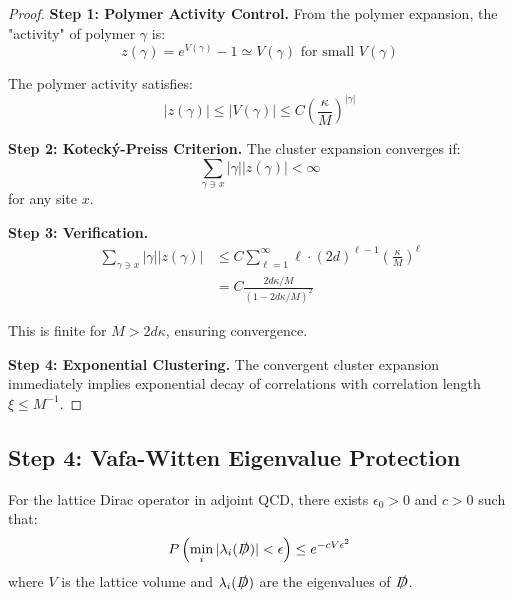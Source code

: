 \begin{proof}
\textbf{Step 1: Polymer Activity Control.}
From the polymer expansion, the "activity" of polymer $\gamma$ is:
\begin{equation}
z(\gamma) = e^{V(\gamma)} - 1 \simeq V(\gamma) \text{ for small } V(\gamma)
\end{equation}

The polymer activity satisfies:
\begin{equation}
|z(\gamma)| \leq |V(\gamma)| \leq C\left(\frac{\kappa}{M}\right)^{|\gamma|}
\end{equation}

\textbf{Step 2: Kotecký-Preiss Criterion.}
The cluster expansion converges if:
\begin{equation}
\sum_{\gamma \ni x} |\gamma| |z(\gamma)| < \infty
\end{equation}
for any site $x$.

\textbf{Step 3: Verification.}
\begin{align}
\sum_{\gamma \ni x} |\gamma| |z(\gamma)| &\leq C \sum_{\ell=1}^{\infty} \ell \cdot (2d)^{\ell-1} \left(\frac{\kappa}{M}\right)^\ell \\
&= C \frac{2d\kappa/M}{(1 - 2d\kappa/M)^2}
\end{align}

This is finite for $M > 2d\kappa$, ensuring convergence.

\textbf{Step 4: Exponential Clustering.}
The convergent cluster expansion immediately implies exponential decay of correlations with correlation length $\xi \leq M^{-1}$.
\end{proof}

\subsection{Step 4: Vafa-Witten Eigenvalue Protection}

\begin{theorem}
\label{thm:vafa_witten_eigenvalue}
For the lattice Dirac operator in adjoint QCD, there exists $\epsilon_0 > 0$ and $c > 0$ such that:
\begin{equation}
P\left(\min_i |\lambda_i(\slashed{D})| < \epsilon\right) \leq e^{-cV\epsilon^2}
\end{equation}
where $V$ is the lattice volume and $\lambda_i(\slashed{D})$ are the eigenvalues of $\slashed{D}$.
\end{theorem}

